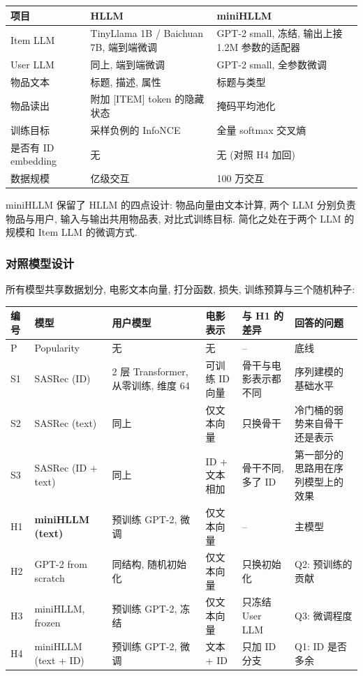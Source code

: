 \documentclass{article}
\begin{document}
\begin{center}
\small
\begin{tabularx}{\textwidth}{lXX}
\toprule
项目 & HLLM & miniHLLM \\
\midrule
Item LLM & TinyLlama 1B / Baichuan 7B, 端到端微调 & GPT-2 small, 冻结, 输出上接 1.2M 参数的适配器 \\
User LLM & 同上, 端到端微调 & GPT-2 small, 全参数微调 \\
物品文本 & 标题, 描述, 属性 & 标题与类型 \\
物品读出 & 附加 [ITEM] token 的隐藏状态 & 掩码平均池化 \\
训练目标 & 采样负例的 InfoNCE & 全量 softmax 交叉熵 \\
是否有 ID embedding & 无 & 无 (对照 H4 加回) \\
数据规模 & 亿级交互 & 100 万交互 \\
\bottomrule
\end{tabularx}
\end{center}

miniHLLM 保留了 HLLM 的四点设计: 物品向量由文本计算, 两个 LLM 分别负责物品与用户, 输入与输出共用物品表, 对比式训练目标. 简化之处在于两个 LLM 的规模和 Item LLM 的微调方式.

\subsubsection{对照模型设计}

所有模型共享数据划分, 电影文本向量, 打分函数, 损失, 训练预算与三个随机种子:

\begin{center}
\small
\begin{tabularx}{\textwidth}{llXXXX}
\toprule
编号 & 模型 & 用户模型 & 电影表示 & 与 H1 的差异 & 回答的问题 \\
\midrule
P & Popularity & 无 & 无 & -- & 底线 \\
S1 & SASRec (ID) & 2 层 Transformer, 从零训练, 维度 64 & 可训练 ID 向量 & 骨干与电影表示都不同 & 序列建模的基础水平 \\
S2 & SASRec (text) & 同上 & 仅文本向量 & 只换骨干 & 冷门桶的弱势来自骨干还是表示 \\
S3 & SASRec (ID + text) & 同上 & ID + 文本相加 & 骨干不同, 多了 ID & 第一部分的思路用在序列模型上的效果 \\
H1 & \textbf{miniHLLM (text)} & 预训练 GPT-2, 微调 & 仅文本向量 & -- & 主模型 \\
H2 & GPT-2 from scratch & 同结构, 随机初始化 & 仅文本向量 & 只换初始化 & Q2: 预训练的贡献 \\
H3 & miniHLLM, frozen & 预训练 GPT-2, 冻结 & 仅文本向量 & 只冻结 User LLM & Q3: 微调程度 \\
H4 & miniHLLM (text + ID) & 预训练 GPT-2, 微调 & 文本 + ID & 只加 ID 分支 & Q1: ID 是否多余 \\
\bottomrule
\end{tabularx}
\end{center}
\end{document}
